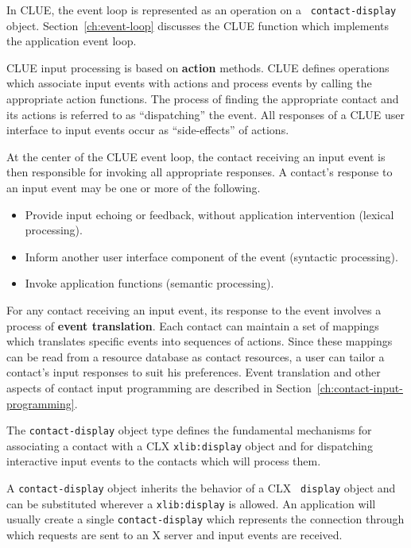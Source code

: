 In CLUE, the event loop is represented as an operation on a {\tt
contact-display} object. Section~\ref{ch:event-loop} discusses the CLUE function
which implements the application event loop.

CLUE input processing is based on {\bf action} methods.
CLUE defines  operations which
associate input events with actions and  process events by
calling the appropriate action functions.
The process of finding the appropriate contact and its actions is
referred to as ``dispatching'' the event.
All responses of a CLUE user
interface to input events occur as ``side-effects'' of actions. 


At the center of the CLUE event loop,
the contact receiving an input event is then responsible for invoking all
appropriate responses. A contact's
response to an input event may be one or more of the following.
\begin{itemize}
\item Provide input echoing or feedback, without application intervention
(lexical processing).
\item Inform another  user interface component of the
event (syntactic processing).
\item Invoke application functions
(semantic processing).
\end{itemize}
 
For any contact receiving an input event, its response to the event involves a
process of {\bf event translation}.
Each contact can maintain a set of mappings which translates  specific events
into sequences of actions. Since
these
mappings can be read from a resource database
as contact resources, a user can tailor a contact's input responses to suit his
preferences. Event translation and other aspects of contact input programming are
described in Section~\ref{ch:contact-input-programming}.

The {\tt contact-display} object type defines the fundamental mechanisms for
associating
a contact  with a CLX {\tt xlib:display} object and for dispatching
interactive input events to the contacts which will process them.


A {\tt contact-display} object inherits the behavior of a CLX {\tt
display} object
and can be substituted wherever a 
{\tt xlib:display} is allowed\footnotemark{}.  An application will usually create a single {\tt contact-display} which
represents the connection through which requests are sent to an X server and input events are received.

